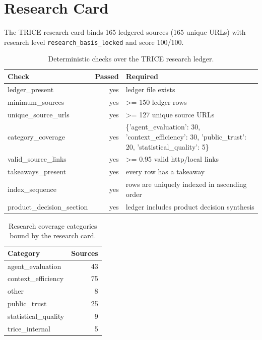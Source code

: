 \section{Research Card}
The TRICE research card binds 165 ledgered sources (165 unique URLs) with research level \texttt{research\_basis\_locked} and score 100/100.

\begin{table}[h]
\centering
\begin{tabular}{lrl}
\toprule
Check & Passed & Required \\
\midrule
ledger\_present & yes & ledger file exists \\
minimum\_sources & yes & >= 150 ledger rows \\
unique\_source\_urls & yes & >= 127 unique source URLs \\
category\_coverage & yes & \{'agent\_evaluation': 30, 'context\_efficiency': 30, 'public\_trust': 20, 'statistical\_quality': 5\} \\
valid\_source\_links & yes & >= 0.95 valid http/local links \\
takeaways\_present & yes & every row has a takeaway \\
index\_sequence & yes & rows are uniquely indexed in ascending order \\
product\_decision\_section & yes & ledger includes product decision synthesis \\
\bottomrule
\end{tabular}
\caption{Deterministic checks over the TRICE research ledger.}
\end{table}

\begin{table}[h]
\centering
\begin{tabular}{lr}
\toprule
Category & Sources \\
\midrule
agent\_evaluation & 43 \\
context\_efficiency & 75 \\
other & 8 \\
public\_trust & 25 \\
statistical\_quality & 9 \\
trice\_internal & 5 \\
\bottomrule
\end{tabular}
\caption{Research coverage categories bound by the research card.}
\end{table}

